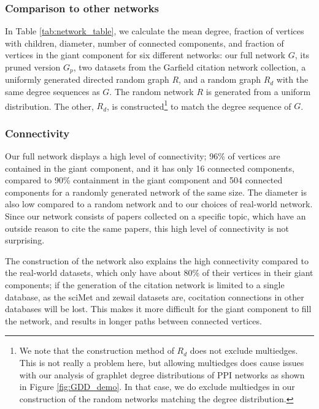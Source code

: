 \documentclass[12pt]{thesis}
\theoremstyle{plain}
\theoremstyle{definition}
\theoremstyle{remark}
\begin{document}
\subsubsection{Comparison to other networks}
In Table \ref{tab:network_table}, we calculate the mean degree, fraction of vertices with children, diameter, number of connected components, and fraction of vertices in the giant component for six different networks: our full network $G$, its pruned version $G_p$, two datasets from the Garfield citation network collection, a uniformly generated directed random graph $R$, and a random graph $R_d$ with the same degree sequences as $G$. The random network $R$ is generated from a uniform distribution. The other, $R_d$, is constructed\footnote{We note that the construction method of $R_d$ does not exclude multiedges. This is not really a problem here, but allowing multiedges does cause issues with our analysis of graphlet degree distributions of PPI networks as shown in Figure \ref{fig:GDD_demo}. In that case, we do exclude multiedges in our construction of the random networks matching the degree distribution.} to match the degree sequence of $G$.

\subsubsection{Connectivity}

Our full network displays a high level of connectivity; 96\% of vertices are contained in the giant component, and it has only 16 connected components, compared to 90\% containment in the giant component and 504 connected components for a randomly generated network of the same size. The diameter is also low compared to a random network and to our choices of real-world network. Since our network consists of papers collected on a specific topic, which have an outside reason to cite the same papers, this high level of connectivity is not surprising. 

The construction of the network also explains the high connectivity compared to the real-world datasets, which only have about 80\% of their vertices in their giant components; if the generation of the citation network is limited to a single database, as the sciMet and zewail datasets are, cocitation connections in other databases will be lost. This makes it more difficult for the giant component to fill the network, and results in longer paths between connected vertices.
\end{document}
